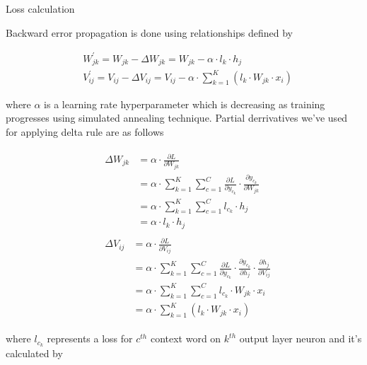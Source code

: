 \documentclass{article}
\newcommand{\SetAlgoStyle}{
	\SetAlgoNoLine
	\SetAlgoNoEnd
	\DontPrintSemicolon
}
\begin{document}
\begin{algorithm}[H]
	\caption{Loss calculation}
	\SetAlgoStyle
\end{algorithm}

Backward error propagation is done using relationships defined by

\begin{align}
	&W_{jk}^\prime = W_{jk} - \Delta W_{jk} =
	W_{jk} - \alpha \cdot l_k \cdot h_j \\
	&V_{ij}^\prime = V_{ij} - \Delta V_{ij} =
	V_{ij} - \alpha \cdot \sum_{k=1}^K (l_k \cdot W_{jk} \cdot x_i)
\end{align}

where $\alpha$ is a learning rate hyperparameter which is decreasing as
training progresses using simulated annealing technique.
Partial derrivatives we've used for applying delta rule are as follows

\begin{align}
	&\begin{aligned}
		\Delta W_{jk} &= \alpha \cdot \frac{\partial L}{\partial W_{jk}} \\
		&= \alpha \cdot \sum_{k=1}^K \sum_{c=1}^C \frac{\partial L}{\partial y_{c_k}}
		\cdot \frac{\partial y_{c_k}}{\partial W_{jk}} \\
		&= \alpha \cdot \sum_{k=1}^K \sum_{c=1}^C l_{c_k} \cdot h_j \\
		&= \alpha \cdot l_k \cdot h_j
	\end{aligned} \\
	&\begin{aligned}
		\Delta V_{ij} &= \alpha \cdot \frac{\partial L}{\partial V_{ij}} \\
		&= \alpha \cdot \sum_{k=1}^K \sum_{c=1}^C \frac{\partial L}{\partial y_{c_k}}
		\cdot \frac{\partial y_{c_k}}{\partial h_j} \cdot
		\frac{\partial h_j}{\partial V_{ij}} \\
		&= \alpha \cdot \sum_{k=1}^K \sum_{c=1}^C l_{c_k} \cdot W_{jk} \cdot x_i \\
		&= \alpha \cdot \sum_{k=1}^K (l_k \cdot W_{jk} \cdot x_i)
	\end{aligned}
\end{align}

where $l_{c_k}$ represents a loss for $c^{th}$ context word on $k^{th}$ output layer
neuron and it's calculated by
\end{document}
